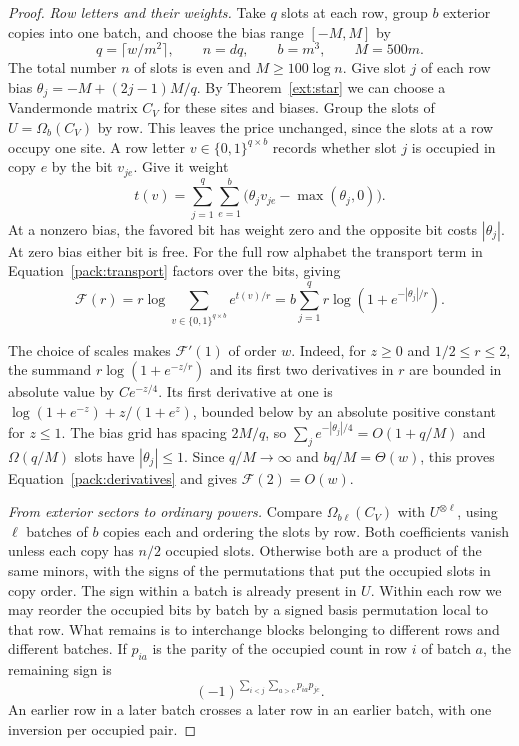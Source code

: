 \begin{proof}
\emph{Row letters and their weights.}
Take $q$ slots at each row, group $b$ exterior copies into one batch,
and choose the bias range $[-M,M]$ by
\[
 q=\lceil w/m^2\rceil,\qquad n=dq,\qquad b=m^3,\qquad M=500m .
\]
The total number $n$ of slots is even and $M\ge100\log n$. Give slot
$j$ of each row bias $\theta_j=-M+(2j-1)M/q$. By
Theorem~\ref{ext:star} we can choose a Vandermonde matrix $C_V$ for
these sites and biases. Group the slots of $U=\Omega_b(C_V)$ by row.
This leaves the price unchanged, since the slots at a row occupy one
site. A row letter $v\in \{0,1\}^{q\times b}$ records whether slot
$j$ is occupied in copy $e$ by the bit $v_{je}$. Give it weight
\begin{equation}\label{pack:letters}
 t(v)=\sum_{j=1}^q\sum_{e=1}^b
           \big(\theta_j v_{je}-\max(\theta_j,0)\big).
\end{equation}
At a nonzero bias, the favored bit has weight zero and the opposite
bit costs $|\theta_j|$. At zero bias either bit is free. For the full row alphabet the
transport term in Equation~\eqref{pack:transport} factors over the bits,
giving
\begin{equation}\label{pack:free}
 \mathcal F(r)=r\log\sum_{v\in\{0,1\}^{q\times b}}e^{t(v)/r}
      =b\sum_{j=1}^q r\log(1+e^{-|\theta_j|/r}).
\end{equation}

The choice of scales makes $\mathcal F'(1)$ of order $w$. Indeed, for
$z\ge0$ and $1/2\le r\le2$, the summand $r\log(1+e^{-z/r})$ and
its first two derivatives in $r$ are bounded in absolute value by
$C e^{-z/4}$. Its first derivative at one is
$\log(1+e^{-z})+z/(1+e^z)$, bounded below by an absolute positive
constant for $z\le1$. The bias grid has spacing $2M/q$, so
$\sum_j e^{-|\theta_j|/4}=O(1+q/M)$ and $\Omega(q/M)$ slots have
$|\theta_j|\le1$. Since $q/M\to\infty$ and $bq/M=\Theta(w)$, this
proves Equation~\eqref{pack:derivatives} and gives $\mathcal F(2)=O(w)$.

\smallskip
\noindent\emph{From exterior sectors to ordinary powers.}
Compare $\Omega_{b\ell}(C_V)$ with $U^{\otimes\ell}$, using $\ell$
batches of $b$ copies each and ordering the slots by row. Both
coefficients vanish unless each copy has $n/2$ occupied slots.
Otherwise both are a product of the same minors, with the signs of
the permutations that put the occupied slots in copy order. The sign
within a batch is already present in $U$. Within each row we may
reorder the occupied bits by batch by a signed basis permutation
local to that row. What remains is to interchange blocks belonging
to different rows and different batches. If $p_{ia}$ is the parity
of the occupied count in row $i$ of batch $a$, the remaining sign is
\[
       (-1)^{\sum_{i<j}\sum_{a>c}p_{ia}p_{jc}} .
\]
An earlier row in a later batch crosses a later row in an earlier
batch, with one inversion per occupied pair.


\end{proof}
